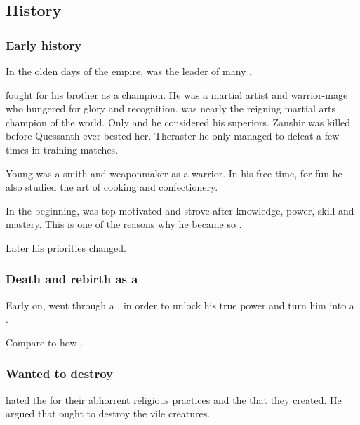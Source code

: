 









\subsection{History}





\subsubsection{Early history}

In the olden days of the \draconian{} empire, \Nexagglachel was the leader of many \dragons. 

\Quessanth fought for his brother as a champion.
He was a martial artist and warrior-mage who hungered for glory and recognition. 
\Quessanth was nearly the reigning martial arts champion of the world. Only  and  he considered his superiors. Zanshir was killed before Quessanth ever bested her. Theraster he only managed to defeat a few times in training matches. 

Young \Quessanth was a smith and weaponmaker as a warrior. 
In his free time, for fun he also studied the art of cooking and confectionery. 

In the beginning, \Ishnaruchaefir{} was top motivated and strove after knowledge, power, skill and mastery. 
This is one of the reasons why he became so . 

Later his priorities changed. 







\subsubsection{Death and rebirth as a \dragon}
Early on, \Ishnaruchaefir{} went through a , in order to unlock his true power and turn him into a {\dragon}.

Compare to how .





\subsubsection{Wanted to destroy \humans}
\Ishnaruchaefir hated the \humans for their abhorrent religious practices and the  that they created. 
He argued that \dragonkind ought to destroy the vile creatures. 

